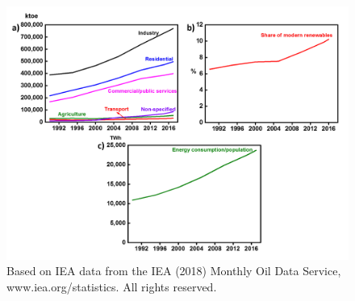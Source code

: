 \begin{figure}[tbh!]
\centering
\includegraphics[width=\textwidth]{Figures/chap1fig/IECdata}
\caption{Based on IEA data from the IEA (2018) Monthly Oil Data Service, www.iea.org/statistics. All rights reserved.}
\label{Figures/chap1fig:IECdata}
\end{figure}

